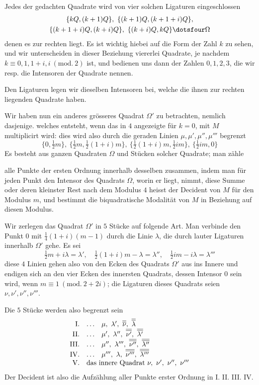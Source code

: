 Jedes der gedachten Quadrate wird von vier solchen Ligaturen einge\-schlossen
\[
\begin{gathered}
\{kQ,(k+1)Q\},\ \{(k+1)Q,(k+1+i)Q\},\\
\{(k+1+i)Q,(k+i)Q\},\ \{(k+i)Q,kQ\}\dotsfour\Omega
\end{gathered}
\]
denen es zur rechten liegt. Es ist wichtig hiebei auf die Form der Zahl $k$ zu sehen, und wir unterscheiden in dieser Beziehung viererlei Quadrate, je nachdem $k\equiv0,1,1+i,i\ (\mathrm{mod.}\ 2)$ ist, und bedienen uns dann der Zahlen $0,1,2,3$, die wir resp. die Intensoren der Quadrate nennen.

Den Ligaturen legen wir dieselben Intensoren bei, welche die ihnen zur rechten liegenden Quadrate haben.

Wir haben nun ein anderes grösseres Quadrat $\Omega'$ zu betrachten, nemlich dasjenige. welches entsteht, wenn das in $4$ angezeigte für $k=0$, mit $M$ multiplicirt wird: dies wird also durch die geraden Linien $\mu,\mu',\mu'',\mu'''$ begrenzt
\[
\{0,\tfrac12m\},\ \{\tfrac12m,\tfrac12(1+i)m\},\ \{\tfrac12(1+i)m,\tfrac12im\},\ \{\tfrac12im,0\}
\]
Es besteht aus ganzen Quadraten $\Omega$ und Stücken solcher Quadrate; man zähle

alle Punkte der ersten Ordnung innerhalb desselben zusammen, indem man für jeden Punkt den Intensor des Quadrats $\Omega$, worin er liegt, nimmt, diese Summe oder deren kleinster Rest nach dem Modulus $4$ heisst der Decident von $M$ für den Modulus $m$, und bestimmt die biquadratische Modalität von $M$ in Beziehung auf diesen Modulus.

Wir zerlegen das Quadrat $\Omega'$ in $5$ Stücke auf folgende Art. Man verbinde den Punkt $0$ mit $\frac14(1+i)(m-1)$ durch die Linie $\lambda$, die durch lauter Ligaturen innerhalb $\Omega'$ gehe. Es sei
\[
\tfrac12m+i\lambda=\lambda',\quad\tfrac12(1+i)m-\lambda=\lambda'',\quad\tfrac12im-i\lambda=\lambda'''
\]
diese $4$ Linien gehen also von den Ecken des Quadrats $\Omega'$ aus ins Innere und endigen sich an den vier Ecken des innersten Quadrats, dessen Intensor $0$ sein wird, wenn $m\equiv1\ (\mathrm{mod.}\ 2+2i)$; die Ligaturen dieses Quadrats seien $\nu,\nu',\nu'',\nu'''$.

Die $5$ Stücke werden also begrenzt sein
\[
\begin{array}{rll}
\mathrm{I}.&\ldots&\mu,\ \lambda',\ \overline{\overline\nu},\ \overline{\overline\lambda}\\
\mathrm{II}.&\ldots&\mu',\ \lambda'',\ \overline{\overline{\nu'}},\ \overline{\overline{\lambda'}}\\
\mathrm{III}.&\ldots&\mu'',\ \lambda''',\ \overline{\overline{\nu''}},\ \overline{\overline{\lambda''}}\\
\mathrm{IV}.&\ldots&\mu''',\ \lambda,\ \overline{\overline{\nu'''}},\ \overline{\overline{\lambda'''}}\\
\mathrm{V}.&\multicolumn{2}{l}{\text{das innere Quadrat }\nu,\ \nu',\ \nu'',\ \nu'''}
\end{array}
\]
Der Decident ist also die Aufzählung aller Punkte erster Ordnung in I. II. III. IV.


